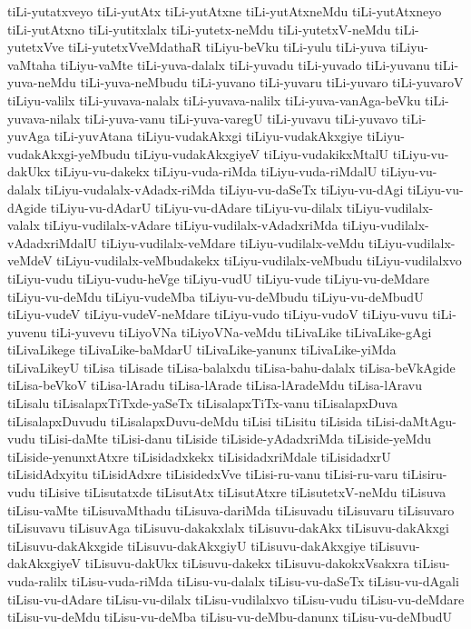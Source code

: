 {tiLi-yutatxveyo
tiLi-yutAtx
tiLi-yutAtxne
tiLi-yutAtxneMdu
tiLi-yutAtxneyo
tiLi-yutAtxno
tiLi-yutitxlalx
tiLi-yutetx-neMdu
tiLi-yutetxV-neMdu
tiLi-yutetxVve
tiLi-yutetxVveMdathaR
tiLiyu-beVku
tiLi-yulu
tiLi-yuva
tiLiyu-vaMtaha
tiLiyu-vaMte
tiLi-yuva-dalalx
tiLi-yuvadu
tiLi-yuvado
tiLi-yuvanu
tiLi-yuva-neMdu
tiLi-yuva-neMbudu
tiLi-yuvano
tiLi-yuvaru
tiLi-yuvaro
tiLi-yuvaroV
tiLiyu-valilx
tiLi-yuvava-nalalx
tiLi-yuvava-nalilx
tiLi-yuva-vanAga-beVku
tiLi-yuvava-nilalx
tiLi-yuva-vanu
tiLi-yuva-varegU
tiLi-yuvavu
tiLi-yuvavo
tiLi-yuvAga
tiLi-yuvAtana
tiLiyu-vudakAkxgi
tiLiyu-vudakAkxgiye
tiLiyu-vudakAkxgi-yeMbudu
tiLiyu-vudakAkxgiyeV
tiLiyu-vudakikxMtalU
tiLiyu-vu-dakUkx
tiLiyu-vu-dakekx
tiLiyu-vuda-riMda
tiLiyu-vuda-riMdalU
tiLiyu-vu-dalalx
tiLiyu-vudalalx-vAdadx-riMda
tiLiyu-vu-daSeTx
tiLiyu-vu-dAgi
tiLiyu-vu-dAgide
tiLiyu-vu-dAdarU
tiLiyu-vu-dAdare
tiLiyu-vu-dilalx
tiLiyu-vudilalx-valalx
tiLiyu-vudilalx-vAdare
tiLiyu-vudilalx-vAdadxriMda
tiLiyu-vudilalx-vAdadxriMdalU
tiLiyu-vudilalx-veMdare
tiLiyu-vudilalx-veMdu
tiLiyu-vudilalx-veMdeV
tiLiyu-vudilalx-veMbudakekx
tiLiyu-vudilalx-veMbudu
tiLiyu-vudilalxvo
tiLiyu-vudu
tiLiyu-vudu-heVge
tiLiyu-vudU
tiLiyu-vude
tiLiyu-vu-deMdare
tiLiyu-vu-deMdu
tiLiyu-vudeMba
tiLiyu-vu-deMbudu
tiLiyu-vu-deMbudU
tiLiyu-vudeV
tiLiyu-vudeV-neMdare
tiLiyu-vudo
tiLiyu-vudoV
tiLiyu-vuvu
tiLi-yuvenu
tiLi-yuvevu
tiLiyoVNa
tiLiyoVNa-veMdu
tiLivaLike
tiLivaLike-gAgi
tiLivaLikege
tiLivaLike-baMdarU
tiLivaLike-yanunx
tiLivaLike-yiMda
tiLivaLikeyU
tiLisa
tiLisade
tiLisa-balalxdu
tiLisa-bahu-dalalx
tiLisa-beVkAgide
tiLisa-beVkoV
tiLisa-lAradu
tiLisa-lArade
tiLisa-lAradeMdu
tiLisa-lAravu
tiLisalu
tiLisalapxTiTxde-yaSeTx
tiLisalapxTiTx-vanu
tiLisalapxDuva
tiLisalapxDuvudu
tiLisalapxDuvu-deMdu
tiLisi
tiLisitu
tiLisida
tiLisi-daMtAgu-vudu
tiLisi-daMte
tiLisi-danu
tiLiside
tiLiside-yAdadxriMda
tiLiside-yeMdu
tiLiside-yenunxtAtxre
tiLisidadxkekx
tiLisidadxriMdale
tiLisidadxrU
tiLisidAdxyitu
tiLisidAdxre
tiLisidedxVve
tiLisi-ru-vanu
tiLisi-ru-varu
tiLisiru-vudu
tiLisive
tiLisutatxde
tiLisutAtx
tiLisutAtxre
tiLisutetxV-neMdu
tiLisuva
tiLisu-vaMte
tiLisuvaMthadu
tiLisuva-dariMda
tiLisuvadu
tiLisuvaru
tiLisuvaro
tiLisuvavu
tiLisuvAga
tiLisuvu-dakakxlalx
tiLisuvu-dakAkx
tiLisuvu-dakAkxgi
tiLisuvu-dakAkxgide
tiLisuvu-dakAkxgiyU
tiLisuvu-dakAkxgiye
tiLisuvu-dakAkxgiyeV
tiLisuvu-dakUkx
tiLisuvu-dakekx
tiLisuvu-dakokxVsakxra
tiLisu-vuda-ralilx
tiLisu-vuda-riMda
tiLisu-vu-dalalx
tiLisu-vu-daSeTx
tiLisu-vu-dAgali
tiLisu-vu-dAdare
tiLisu-vu-dilalx
tiLisu-vudilalxvo
tiLisu-vudu
tiLisu-vu-deMdare
tiLisu-vu-deMdu
tiLisu-vu-deMba
tiLisu-vu-deMbu-danunx
tiLisu-vu-deMbudU
}
